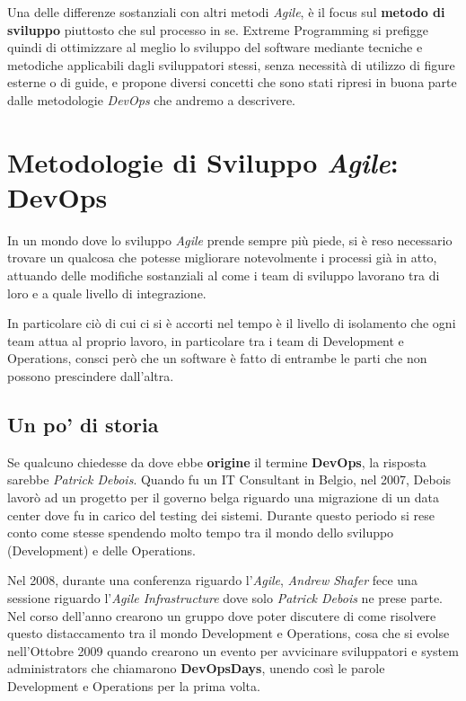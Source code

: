 \documentclass[a4paper,12pt]{report}
\begin{document}
			Una delle differenze sostanziali con altri metodi \emph{Agile}, è il focus sul \textbf{metodo di sviluppo} piuttosto che sul processo in se. Extreme Programming si prefigge quindi di ottimizzare al meglio lo sviluppo del software mediante tecniche e metodiche applicabili dagli sviluppatori stessi, senza necessità di utilizzo di figure esterne o di guide, e propone diversi concetti che sono stati ripresi in buona parte dalle metodologie \emph{DevOps} che andremo a descrivere.
	
		\section{Metodologie di Sviluppo \emph{Agile}: DevOps}
		
			In un mondo dove lo sviluppo \emph{Agile} prende sempre più piede, si è reso necessario trovare un qualcosa che potesse migliorare notevolmente i processi già in atto, attuando delle modifiche sostanziali al come i team di sviluppo lavorano tra di loro e a quale livello di integrazione.
			
			In particolare ciò di cui ci si è accorti nel tempo è il livello di isolamento che ogni team attua al proprio lavoro, in particolare tra i team di Development e Operations, consci però che un software è fatto di entrambe le parti che non possono prescindere dall'altra.
		
			\subsection{Un po' di storia}
				
				Se qualcuno chiedesse da dove ebbe \textbf{origine} il termine \textbf{DevOps}, la risposta sarebbe \emph{Patrick Debois}. Quando fu un IT Consultant in Belgio, nel 2007, Debois lavorò ad un progetto per il governo belga riguardo una migrazione di un data center dove fu in carico del testing dei sistemi. Durante questo periodo si rese conto come stesse spendendo molto tempo tra il mondo dello sviluppo (Development) e delle Operations.
				
				Nel 2008, durante una conferenza riguardo l'\emph{Agile}, \emph{Andrew Shafer} fece una sessione riguardo l'\emph{Agile Infrastructure} dove solo \emph{Patrick Debois} ne prese parte. Nel corso dell'anno crearono un gruppo dove poter discutere di come risolvere questo distaccamento tra il mondo Development e Operations, cosa che si evolse nell'Ottobre 2009 quando crearono un evento per avvicinare sviluppatori e system administrators che chiamarono \textbf{DevOpsDays}, unendo così le parole Development e Operations per la prima volta.
				
\end{document}
